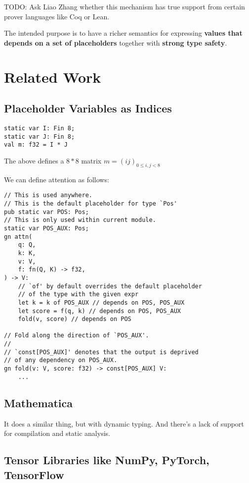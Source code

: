 \documentclass{article}
\begin{document}
TODO: Ask Liao Zhang whether this mechanism has true support from certain prover languages like Coq or Lean.

The intended purpose is to have a richer semantics for expressing \textbf{values that depends on a set of placeholders} together with \textbf{strong type safety}.

\section{Related Work}
\subsection{Placeholder Variables as Indices}

\begin{tcolorbox}[colback=gray!5,colframe=gray!50!black,title=Husky Code]
    \begin{lstlisting}[language=Husky]
static var I: Fin 8;
static var J: Fin 8;
val m: f32 = I * J
\end{lstlisting}
\end{tcolorbox}

The above defines a $8*8$ matrix $m=(ij)_{0\le i,j<8}$

We can define attention as follows:

\begin{tcolorbox}[colback=gray!5,colframe=gray!50!black,title=Husky Code]
    \begin{lstlisting}[language=Husky]
// This is used anywhere.
// This is the default placeholder for type `Pos'
pub static var POS: Pos;
// This is only used within current module.
static var POS_AUX: Pos;
gn attn(
    q: Q,
    k: K,
    v: V,
    f: fn(Q, K) -> f32,
) -> V:
    // `of' by default overrides the default placeholder
    // of the type with the given expr
    let k = k of POS_AUX // depends on POS, POS_AUX
    let score = f(q, k) // depends on POS, POS_AUX
    fold(v, score) // depends on POS

// Fold along the direction of `POS_AUX'.
//
// `const[POS_AUX]' denotes that the output is deprived
// of any dependency on POS_AUX.
gn fold(v: V, score: f32) -> const[POS_AUX] V:
    ...
\end{lstlisting}
\end{tcolorbox}

\subsection{Mathematica}
It does a similar thing, but with dynamic typing. And there's a lack of support for compilation and static analysis.

\subsection{Tensor Libraries like NumPy, PyTorch, TensorFlow}

\end{document}
